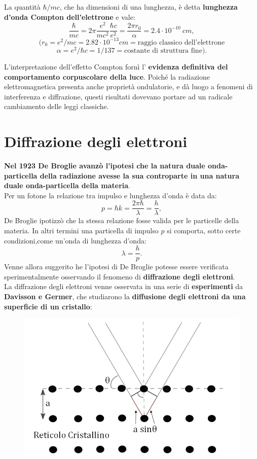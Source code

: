 \documentclass[a4paper,12pt,oneside]{book}
\begin{document}
La quantità $\hbar/ mc$, che ha dimensioni di una lunghezza, è detta \textbf{lunghezza d'onda Compton dell'elettrone} e vale:
\[
\frac{\hbar}{mc}= 2\pi \frac{e^2}{mc^2}\frac{\hbar c}{e^2}= \frac{2\pi r_0}{\alpha}= 2.4 \cdot 10^{-10} \ cm,
\]
\[(r_0 = e^2/mc = 2.82 \cdot 10^{-13} cm = \textrm{raggio classico dell'elettrone}\]
\[\alpha = e^2/\hbar c = 1/137 = \textrm{costante di struttura fine}).\]

L'interpretazione dell'effetto Compton fornì l' \textbf{evidenza definitiva del comportamento corpuscolare della luce}. Poiché la radiazione elettromagnetica presenta anche proprietà ondulatorie, e dà luogo a fenomeni di interferenza e diffrazione, questi risultati dovevano portare ad un radicale cambiamento delle leggi classiche.
\section{Diffrazione degli elettroni}
\textbf{Nel 1923 De Broglie avanzò l'ipotesi che la natura duale onda-particella della radiazione avesse la sua controparte in una natura duale onda-particella della materia}.\\
Per un fotone la relazione tra impulso e lunghezza d'onda è data da:
\begin{equation}
p= \hbar k = \frac{2\pi \hbar}{\lambda}=\frac{h}{\lambda},
\end{equation}
De Broglie ipotizzò che la stessa relazione fosse valida per le particelle della materia. In altri termini una particella di impulso $p$ si comporta, sotto certe condizioni,come un'onda di lunghezza d'onda:
	\begin{equation}
		\boxed{\boxed{
			\lambda=\frac{h}{p}.
			}}
	\end{equation}
Venne allora suggerito he l'ipotesi di De Broglie potesse essere verificata sperimentalmente osservando il fenomeno di \textbf{diffrazione degli elettroni}.\\
La diffrazione degli elettroni venne osservata in una serie di \textbf{esperimenti} da \textbf{Davisson e Germer}, che studiarono la \textbf{diffusione degli elettroni da una superficie di un cristallo}:
	\begin{figure}[!htbp]
		\begin{center}
			\includegraphics[width=.55\textwidth]{immagini/cap_1/fig_1_5.png}
		\end{center}
	\end{figure}
\end{document}
